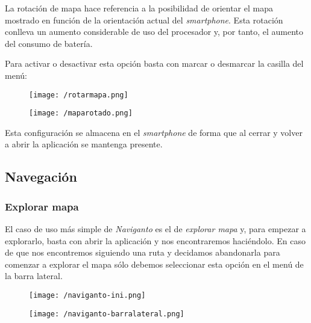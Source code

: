 La rotación de mapa hace referencia a la posibilidad de orientar el mapa mostrado en función de la
orientación actual del \emph{smartphone}. Esta rotación conlleva un aumento considerable de uso del
procesador y, por tanto, el aumento del consumo de batería.

Para activar o desactivar esta opción basta con marcar o desmarcar la casilla del menú:

\begin{figure}[h]
  \begin{minipage}[b]{0.5\linewidth}
    \begin{center}
      \texttt{[image: /rotarmapa.png]}
    \end{center}
  \end{minipage}
  \begin{minipage}[b]{0.5\linewidth}
    \begin{center}
      \texttt{[image: /maparotado.png]}
    \end{center}
  \end{minipage}
\end{figure}

Esta configuración se almacena en el \emph{smartphone} de forma que al cerrar y volver a abrir la
aplicación se mantenga presente.

\subsection{Navegación}

\subsubsection{Explorar mapa}

El caso de uso más simple de \emph{Naviganto} es el de \emph{explorar mapa} y, para empezar a
explorarlo, basta con abrir la aplicación y nos encontraremos haciéndolo. En caso de que nos
encontremos siguiendo una ruta y decidamos abandonarla para comenzar a explorar el mapa sólo debemos
seleccionar esta opción en el menú de la barra lateral.

\begin{figure}[h]
  \begin{minipage}[b]{0.5\linewidth}
    \begin{center}
      \texttt{[image: /naviganto-ini.png]}
    \end{center}
  \end{minipage}
  \begin{minipage}[b]{0.5\linewidth}
    \begin{center}
      \texttt{[image: /naviganto-barralateral.png]}
    \end{center}
  \end{minipage}
\end{figure}


